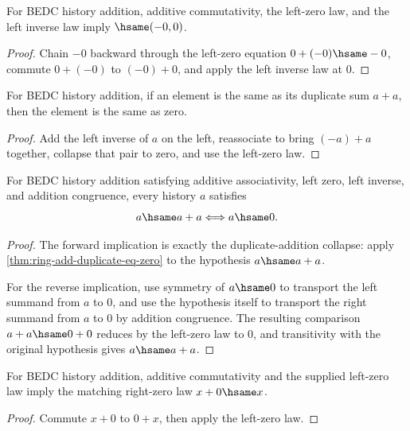 \begin{theorem}
\label{thm:ring-neg-zero}
For BEDC history addition, additive commutativity, the left-zero law, and the
left inverse law imply \(\hsame(-0,0)\).
\end{theorem}
\begin{proof}
Chain \(-0\) backward through the left-zero equation \(0+(-0)\hsame -0\),
commute \(0+(-0)\) to \((-0)+0\), and apply the left inverse law at \(0\).
\end{proof}

\begin{theorem}
\label{thm:ring-add-duplicate-eq-zero}
For BEDC history addition, if an element is the same as its duplicate sum
\(a+a\), then the element is the same as zero.
\end{theorem}
\begin{proof}
Add the left inverse of \(a\) on the left, reassociate to bring
\((-a)+a\) together, collapse that pair to zero, and use the left-zero law.
\end{proof}

\begin{theorem}
\label{thm:ring-add-duplicate-zero-iff}
For BEDC history addition satisfying additive associativity, left zero, left
inverse, and addition congruence, every history $a$ satisfies
$$
a\hsame a+a \Longleftrightarrow a\hsame0.
$$
\end{theorem}
\begin{proof}
The forward implication is exactly the duplicate-addition collapse: apply
\autoref{thm:ring-add-duplicate-eq-zero} to the hypothesis $a\hsame a+a$.

For the reverse implication, use symmetry of $a\hsame0$ to transport the left
summand from $a$ to $0$, and use the hypothesis itself to transport the right
summand from $a$ to $0$ by addition congruence. The resulting comparison
$a+a\hsame0+0$ reduces by the left-zero law to $0$, and transitivity with the
original hypothesis gives $a\hsame a+a$.
\end{proof}

\begin{theorem}
\label{thm:ring-add-right-zero}
For BEDC history addition, additive commutativity and the supplied left-zero
law imply the matching right-zero law $x+0\hsame x$.
\end{theorem}
\begin{proof}
Commute $x+0$ to $0+x$, then apply the left-zero law.
\end{proof}

